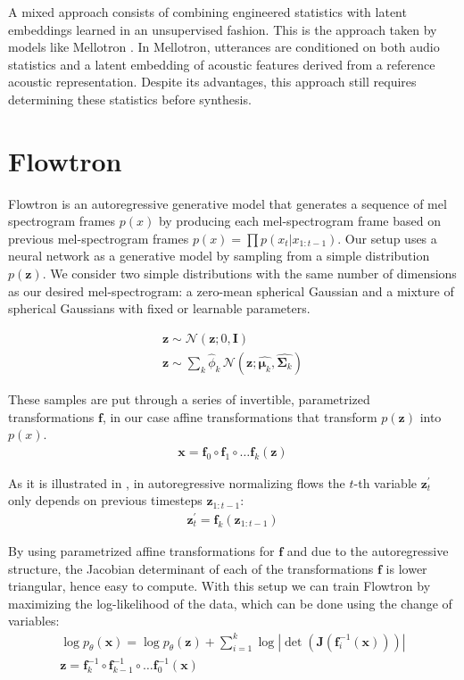 \documentclass{article}
\begin{document}
A mixed approach consists of combining engineered statistics with latent embeddings learned in an unsupervised fashion. This is the approach taken by models like Mellotron \cite{valle2019mellotron}. In Mellotron, utterances are conditioned on both audio statistics and a latent embedding of acoustic features derived from a reference acoustic representation. Despite its advantages, this approach still requires determining these statistics before synthesis. \section{Flowtron}\label{sec:audio_flow}
Flowtron is an autoregressive generative model that generates a sequence of mel spectrogram frames $p(x)$ by producing each mel-spectrogram frame based on previous mel-spectrogram frames $p(x) = \prod p(x_t \vert x_{1:t-1})$. Our setup uses a neural network as a generative model by sampling from a simple distribution $p(\boldsymbol{z})$. We consider two simple distributions with the same number of dimensions as our desired mel-spectrogram: a zero-mean spherical Gaussian and a mixture of spherical Gaussians with fixed or learnable parameters.

\begin{gather}
\boldsymbol{z} \sim \mathcal{N}(\boldsymbol{z};0,\boldsymbol{I}) \\
\boldsymbol{z} \sim \sum_k \hat{\phi}_k\, \mathcal{N}(\boldsymbol{z};\hat{\boldsymbol{\mu}_k},\hat{\boldsymbol{\Sigma}_k})
\end{gather}

These samples are put through a series of invertible, parametrized transformations $\boldsymbol{f}$, in our case affine transformations that transform $p(\boldsymbol{z})$ into $p(x)$.
\begin{gather}
\boldsymbol{x} = \boldsymbol{f}_0 \circ \boldsymbol{f}_1 \circ \ldots \boldsymbol{f}_k(\boldsymbol{z})
\end{gather}

As it is illustrated in \cite{kingma2016improved}, in autoregressive normalizing flows the $t$-th variable $\boldsymbol{z}^\prime_{t}$ only depends on previous timesteps $\boldsymbol{z}_{1:t-1}$:
\begin{gather}
\boldsymbol{z}^\prime_{t} = \boldsymbol{f}_{k} (\boldsymbol{z}_{1:t-1})
\end{gather}

By using parametrized affine transformations for $\boldsymbol{f}$ and due to the autoregressive structure, the Jacobian determinant of each of the transformations $\boldsymbol{f}$ is lower triangular, hence easy to compute. With this setup we can train Flowtron by maximizing the log-likelihood of the data, which can be done using the change of variables:
\begin{gather}
\log{p_\theta(\boldsymbol{x})} = \log{p_\theta(\boldsymbol{z})} + \sum_{i=1}^{k} \log
|\det(\boldsymbol{J}(\boldsymbol{f}_i^{-1}(\boldsymbol{x})))| \\
\boldsymbol{z} = \boldsymbol{f}_k^{-1} \circ \boldsymbol{f}_{k-1}^{-1} \circ \ldots \boldsymbol{f}_0^{-1}(\boldsymbol{x})
\end{gather}
\end{document}
